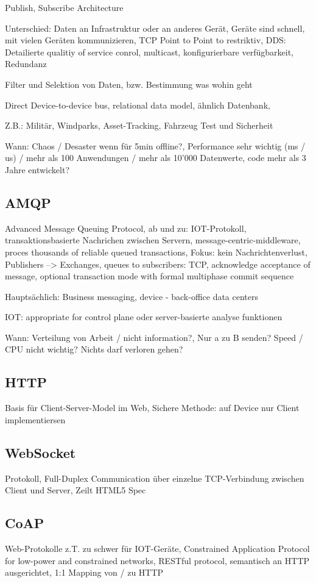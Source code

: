 Publish, Subscribe Architecture

Unterschied: Daten an Infrastruktur oder an anderes Gerät, Geräte sind schnell, mit vielen Geräten kommunizieren, TCP Point to Point to restriktiv, DDS: Detailierte qualitiy of service conrol, multicast, konfigurierbare verfügbarkeit, Redundanz

Filter und Selektion von Daten, bzw. Bestimmung was wohin geht

Direct Device-to-device bus, relational data model, ähnlich Datenbank, 

Z.B.: Militär, Windparks, Asset-Tracking, Fahrzeug Test und Sicherheit


Wann: Chaos / Desaster wenn für 5min offline?, Performance sehr wichtig (ms / us) / mehr als 100 Anwendungen / mehr als 10'000 Datenwerte, code mehr als 3 Jahre entwickelt?
\subsection{AMQP}
Advanced Message Queuing Protocol, ab und zu: IOT-Protokoll, transaktionsbasierte Nachrichen zwischen Servern, message-centric-middleware, proces thousands of reliable queued transactions, Fokus: kein Nachrichtenverlust, Publishers --> Exchanges, queues to subscribers: TCP, acknowledge acceptance of message, optional transaction mode with formal multiphase commit sequence

Hauptsächlich: Business messaging, device - back-office data centers

IOT: appropriate for control plane oder server-basierte analyse funktionen

Wann: Verteilung von Arbeit / nicht information?, Nur a zu B senden? Speed / CPU nicht wichtig? Nichts darf verloren gehen?
\subsection{HTTP}
Basis für Client-Server-Model im Web, Sichere Methode: auf Device nur Client implementiersen

\subsection{WebSocket}
Protokoll, Full-Duplex Communication über einzelne TCP-Verbindung zwischen Client und Server, Zeilt HTML5 Spec

\subsection{CoAP}
Web-Protokolle z.T. zu schwer für IOT-Geräte, Constrained Application Protocol for low-power and constrained networks, RESTful protocol, semantisch an HTTP ausgerichtet, 1:1 Mapping von / zu HTTP

